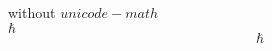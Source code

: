 \documentclass[10pt]{beamer}
\author{李小飞}
\begin{document}
	
\begin{frame}
without $unicode-math$  \\
{\huge 	$\hbar$}
{\Huge 	\[ \hbar \]}
\end{frame}	
\end{document}

